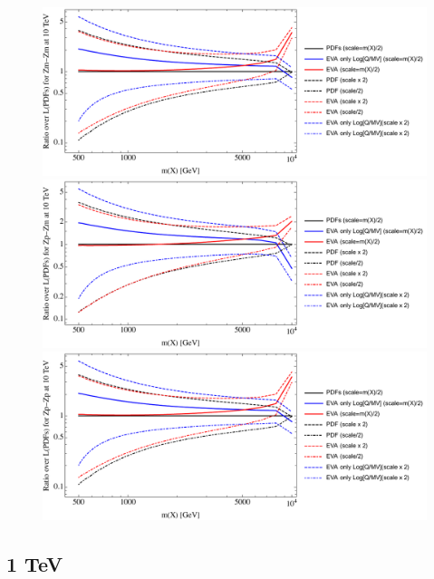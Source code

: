 \documentclass[a4paper,11pt]{article}
\begin{document}
\begin{figure}[ht]
\includegraphics[width=0.46\linewidth]{Notebooks/PlotLumi/10TeV/ratios/Zm-Zm.pdf}
\includegraphics[width=0.46\linewidth]{Notebooks/PlotLumi/10TeV/ratios/Zp-Zm.pdf}
\includegraphics[width=0.46\linewidth]{Notebooks/PlotLumi/10TeV/ratios/Zp-Zp.pdf}
\end{figure}

%
%
%
\clearpage
\subsection{1 TeV}
\end{document}
